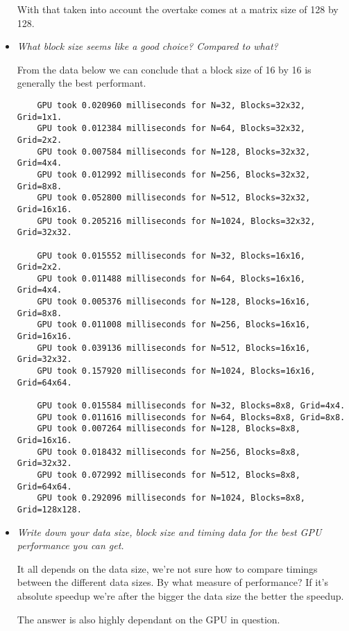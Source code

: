 \documentclass[a4paper,12pt]{article}
\begin{document}
\begin{itemize}
  With that taken into account the overtake comes at a matrix size of 128 by 128.

\item \textit{What block size seems like a good choice? Compared to what?}

  From the data below we can conclude that a block size of 16 by 16 is generally the best performant.

  \begin{lstlisting}
    GPU took 0.020960 milliseconds for N=32, Blocks=32x32, Grid=1x1.
    GPU took 0.012384 milliseconds for N=64, Blocks=32x32, Grid=2x2.
    GPU took 0.007584 milliseconds for N=128, Blocks=32x32, Grid=4x4.
    GPU took 0.012992 milliseconds for N=256, Blocks=32x32, Grid=8x8.
    GPU took 0.052800 milliseconds for N=512, Blocks=32x32, Grid=16x16.
    GPU took 0.205216 milliseconds for N=1024, Blocks=32x32, Grid=32x32.

    GPU took 0.015552 milliseconds for N=32, Blocks=16x16, Grid=2x2.
    GPU took 0.011488 milliseconds for N=64, Blocks=16x16, Grid=4x4.
    GPU took 0.005376 milliseconds for N=128, Blocks=16x16, Grid=8x8.
    GPU took 0.011008 milliseconds for N=256, Blocks=16x16, Grid=16x16.
    GPU took 0.039136 milliseconds for N=512, Blocks=16x16, Grid=32x32.
    GPU took 0.157920 milliseconds for N=1024, Blocks=16x16, Grid=64x64.

    GPU took 0.015584 milliseconds for N=32, Blocks=8x8, Grid=4x4.
    GPU took 0.011616 milliseconds for N=64, Blocks=8x8, Grid=8x8.
    GPU took 0.007264 milliseconds for N=128, Blocks=8x8, Grid=16x16.
    GPU took 0.018432 milliseconds for N=256, Blocks=8x8, Grid=32x32.
    GPU took 0.072992 milliseconds for N=512, Blocks=8x8, Grid=64x64.
    GPU took 0.292096 milliseconds for N=1024, Blocks=8x8, Grid=128x128.
  \end{lstlisting}


\item \textit{Write down your data size, block size and timing data for the best GPU performance you can get.}

  It all depends on the data size, we're not sure how to compare timings between the different data sizes. By what measure of performance? If it's absolute speedup we're after the bigger the data size the better the speedup.

  The answer is also highly dependant on the GPU in question.

\end{itemize}
\end{document}
